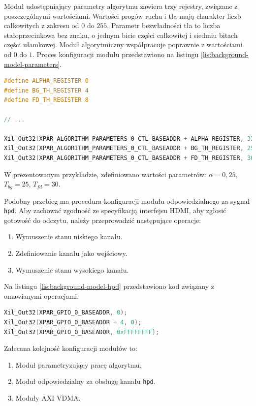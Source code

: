 Moduł udostępniający parametry algorytmu zawiera trzy rejestry, związane z poszczególnymi wartościami. 
Wartości progów ruchu i tła mają charakter liczb całkowitych z zakresu od $0$ do $255$. 
Parametr bezwładności tła to liczba stałoprzecinkowa bez znaku, o jednym bicie części całkowitej i siedmiu bitach części ułamkowej. 
Moduł algorytmiczny współpracuje poprawnie z wartościami od $0$ do $1$. 
Proces konfiguracji modułu przedstawiono na listingu \ref{lis:background-model-parameters}.

\begin{lstlisting}[breaklines,language=C, label=lis:background-model-parameters, caption=Konfiguracja modułu parametryzującego generację tła.]
#define ALPHA_REGISTER 0
#define BG_TH_REGISTER 4
#define FD_TH_REGISTER 8

// ...

Xil_Out32(XPAR_ALGORITHM_PARAMETERS_0_CTL_BASEADDR + ALPHA_REGISTER, 32); // 00100000 = 0.25
Xil_Out32(XPAR_ALGORITHM_PARAMETERS_0_CTL_BASEADDR + BG_TH_REGISTER, 25);
Xil_Out32(XPAR_ALGORITHM_PARAMETERS_0_CTL_BASEADDR + FD_TH_REGISTER, 30);
\end{lstlisting}

W prezentowanym przykładzie, zdefiniowano wartości parametrów: $\alpha = 0,25$, $T_{bg} = 25$, $T_{fd} = 30$.

Podobny przebieg ma procedura konfiguracji modułu odpowiedzialnego za sygnał \texttt{hpd}. 
Aby zachować zgodność ze specyfikacją interfejsu HDMI, aby zgłosić gotowość do odczytu, należy przeprowadzić następujące operacje:
\begin{enumerate}
	\item Wymuszenie stanu niskiego kanału.
	\item Zdefiniowanie kanału jako wejściowy.
	\item Wymuszenie stanu wysokiego kanału.
\end{enumerate}

Na listingu \ref{lis:background-model-hpd} przedstawiono kod związany z omawianymi operacjami.

\begin{lstlisting}[breaklines,language=C, label=lis:background-model-hpd, caption=Konfiguracja modułu sterującego kanałem \texttt{hpd}.]
Xil_Out32(XPAR_GPIO_0_BASEADDR, 0);
Xil_Out32(XPAR_GPIO_0_BASEADDR + 4, 0);
Xil_Out32(XPAR_GPIO_0_BASEADDR, 0xFFFFFFFF);
\end{lstlisting}

Zalecana kolejność konfiguracji modułów to:
\begin{enumerate}
	\item Moduł parametryzujący pracę algorytmu.
	\item Moduł odpowiedzialny za obsługę kanału \texttt{hpd}.
	\item Moduły AXI VDMA.
\end{enumerate}

